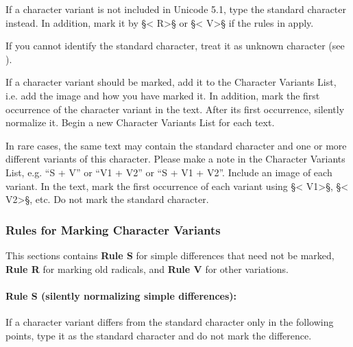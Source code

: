 \documentclass[fontsize=11pt, paper=a4, 
DIV15,
headings=normal,
parskip=half-, 
numbers=noenddot]{scrartcl}
\begin{document}
\vspace{5mm}
\begin{mainrule}
If a character variant is not included in Unicode 5.1, type the standard character instead. In addition, mark it by §< R>§ or §< V>§ if the rules in  apply.
\end{mainrule}

\begin{crossref}
If you cannot identify the standard character, treat it as unknown character (see ).
\end{crossref}

\begin{clarification}
If a character variant should be marked, add it to the Character Variants List, i.e. add the image and how you have marked it. In addition, mark the first occurrence of the character variant in the text. After its first occurrence, silently normalize it. Begin a new Character Variants List for each text. 
\end{clarification}

\begin{note}
In rare cases, the same text may contain the standard character and one or more different variants of this character. Please make a note in the Character Variants List, e.g. “S + V” or “V1 + V2” or “S + V1 + V2”. Include an image of each variant. In the text, mark the first occurrence of each variant using §< V1>§, §< V2>§, etc. Do not mark the standard character.
\end{note}

\subsubsection{Rules for Marking Character Variants}
\label{section rules for marking character variants}

This sections contains \textsf{\textbf{Rule S}} for simple differences that need not be marked, \textsf{\textbf{Rule R}} for marking old radicals, and \textsf{\textbf{Rule V}} for other variations. 

\begin{mainrule}
\paragraph{Rule S (silently normalizing simple differences):} If a character variant differs from the standard character only in the following points, type it as the standard character and do not mark the difference. 
\end{mainrule}
\end{document}
